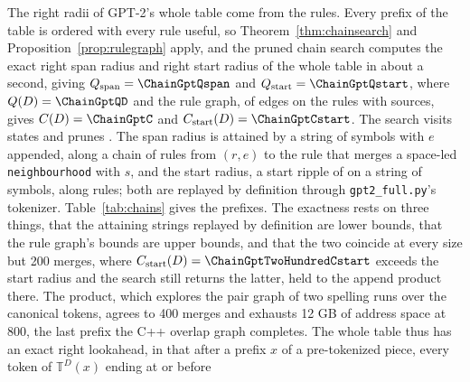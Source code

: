 \documentclass[11pt,a4paper]{article}
\theoremstyle{definition}
\theoremstyle{plain}
\newcommand{\code}[1]{\texttt{#1}}
\newcommand{\T}{\mathbb{T}}
\begin{document}

The right radii of GPT-2's whole table come from the rules. Every prefix of the table is ordered with every rule useful,
so Theorem~\ref{thm:chainsearch} and Proposition~\ref{prop:rulegraph} apply, and the pruned chain search computes the
exact right span radius and right start radius of the whole table in about a second, giving
\(Q_{\mathrm{span}} = \ChainGptQspan\) and \(Q_{\mathrm{start}} = \ChainGptQstart\), where \(Q(D) = \ChainGptQD\) and
the rule graph, of \ChainGptEdges{} edges on the \GptRules{} rules with \ChainGptSources{} sources, gives
\(C(D) = \ChainGptC\) and \(C_{\mathrm{start}}(D) = \ChainGptCstart\). The search visits \ChainGptStates{} states and
prunes \ChainGptPruned{}. The span radius is attained by a string of \ChainGptQspan{} symbols with \(e\) appended, along
a chain of \ChainGptSpanRules{} rules from \((r, e)\) to the rule that merges a space-led \code{neighbourhood} with
\(s\), and the start radius, a start ripple of \ChainGptQstart{} on a string of \ChainGptStartString{} symbols, along
\ChainGptStartRules{} rules; both are replayed by definition through \code{gpt2\_full.py}'s tokenizer.
Table~\ref{tab:chains} gives the prefixes. The exactness rests on three things, that the attaining strings replayed by
definition are lower bounds, that the rule graph's bounds are upper bounds, and that the two coincide at every size but
200 merges, where \(C_{\mathrm{start}}(D) = \ChainGptTwoHundredCstart\) exceeds the start radius
\ChainGptTwoHundredQstart{} and the search still returns the latter, held to the append product there. The product,
which explores the pair graph of two spelling runs over the canonical tokens, agrees to 400 merges and exhausts 12 GB of
address space at 800, the last prefix the C++ overlap graph completes. The whole table thus has an exact right
lookahead, in that after a prefix \(x\) of a pre-tokenized piece, every token of \(\T^D(x)\) ending at or before
\end{document}
